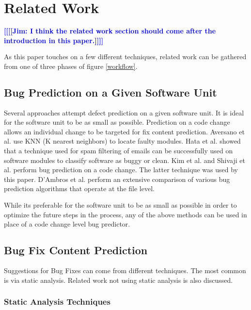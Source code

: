 \documentclass[10pt, conference, letterpaper, compsocconf]{IEEEtran}
\newcommand{\todoc}[2]{{\textcolor{#1} {\textbf{[[#2]]}}}}
\newcommand{\todoblue}[1]{\todoc{blue}{\textbf{[[#1]]}}}
\newcommand{\jim}[1]{\todoblue{Jim: #1}}
\begin{document}
\section{Related Work}
\label{RelatedWork}

\jim{ I think the related work section should come after the introduction in this paper.}
\par As this paper touches on a few different techniques, related work can be gathered from one of three phases of figure \ref{workflow}. 


\subsection{Bug Prediction on a Given Software Unit} 
\par Several approaches attempt defect prediction on a given software unit. It is ideal for the software unit to be as small as possible. Prediction on a code change allows an individual change to be targeted for fix content prediction. Aversano et al. \cite{aversano2007lbi} use KNN (K nearest neighbors) to locate faulty modules.  Hata et al. \cite{Hata2008} showed that a technique used for spam filtering of emails can be successfully used on software modules to classify software as buggy or clean. Kim et al. \cite{Kim2007p58} and Shivaji et al. \cite{shivaji2009reducing} perform bug prediction on a code change. The latter technique was used by this paper. D'Ambros et al. \cite{d2011evaluating} perform an extensive comparison of various bug prediction algorithms that operate at the file level.

\par While its preferable for the software unit to be as small as possible in order to optimize the future steps in the process, any of the above methods can be used in place of a code change level bug predictor.

\subsection{Bug Fix Content Prediction}

Suggestions for Bug Fixes can come from different techniques. The most common is via static analysis. Related work not using static analysis is also discussed. 

\subsubsection{Static Analysis Techniques}
\end{document}

